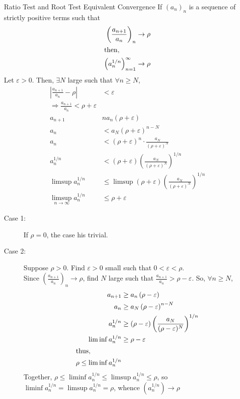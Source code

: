 \documentclass[10pt]{extarticle}
\begin{document}
  \begin{problem}{Ratio Test and Root Test Equivalent Convergence}
    If $(a_n)_n$ is a sequence of strictly positive terms such that
    \begin{align*}
      \left(\frac{a_{n+1}}{a_n}\right)_n &\rightarrow \rho\\
      \shortintertext{then,}
      \left(a_n^{1/n}\right)_{n=1}^{\infty} &\rightarrow \rho
    \end{align*}
    \tcblower
    Let $\varepsilon > 0$. Then, $\exists N$ large such that $\forall n\geq N$,
    \begin{align*}
      \left|\frac{a_{n+1}}{a_n} - \rho\right| &< \varepsilon\tag*{$\forall n\geq N$}\\
      \Rightarrow \frac{a_{n+1}}{a_n} < \rho + \varepsilon\tag*{$\forall n\geq N$}\\
      a_{n+1} &n a_n\left(\rho + \varepsilon\right)\tag*{$\forall n\geq N$}\\
      a_{n} &< a_N \left(\rho + \varepsilon\right)^{n-N}\tag*{$\forall n \geq N$}\\
      a_n &< \left(\rho + \varepsilon\right)^{n}\cdot \frac{a_N}{\left(\rho + \varepsilon\right)^N}\\
      a_n^{1/n} &< \left(\rho + \varepsilon\right) \left(\frac{a_N}{\left(\rho + \varepsilon\right)^N}\right)^{1/n}\\
      \limsup a_n^{1/n}&\leq \limsup \left(\rho + \varepsilon\right) \left(\frac{a_N}{\left(\rho + \varepsilon\right)^N}\right)^{1/n}\\
      \limsup_{n\rightarrow\infty} a_n^{1/n} &\leq \rho + \varepsilon
    \end{align*}
    \begin{description}
      \item[Case 1:] If $\rho = 0$, the case his trivial.
      \item[Case 2:] Suppose $\rho > 0$. Find $\varepsilon > 0$ small such that $0 < \varepsilon < \rho$.\\

        Since $\left(\frac{a_{n+1}}{a_n}\right)_n\rightarrow \rho$, find $N$ large such that $\frac{a_{n+1}}{a_n} > \rho - \varepsilon$. So, $\forall n \geq N$,
        \begin{align*}
          a_{n+1} &\geq a_n\left(\rho-\varepsilon\right)\\
          a_n &\geq a_{N}\left(\rho - \varepsilon\right)^{n-N}\\
          a_n^{1/n} &\geq \left(\rho - \varepsilon\right) \left(\frac{a_N}{(\rho - \varepsilon)^{N}}\right)^{1/n}\\
          \liminf a_n^{1/n} &\geq \rho - \varepsilon\\
          \shortintertext{thus,}
          \rho \leq \liminf a_n^{1/n}
        \end{align*}
        Together, $\rho \leq \liminf a_n^{1/n} \leq \limsup a_n^{1/n} \leq \rho$, so $\liminf a_n^{1/n} = \limsup a_n^{1/n} = \rho$, whence $\left(a_n^{1/n}\right) \rightarrow \rho$
    \end{description}
  \end{problem}
\end{document}
